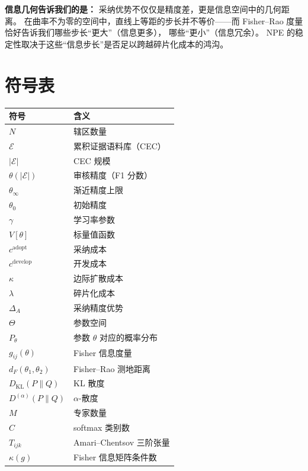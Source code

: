 \documentclass[12pt,a4paper]{article}
\theoremstyle{definition}
\theoremstyle{remark}
\newcommand{\Fisher}{g}
\newcommand{\KL}{D_{\text{KL}}}
\newcommand{\dalpha}{D^{(\alpha)}}
\begin{document}
\textbf{信息几何告诉我们的是：} 采纳优势不仅仅是精度差，更是信息空间中的几何距离。
在曲率不为零的空间中，直线上等距的步长并不等价——而 Fisher--Rao 度量恰好告诉我们哪些步长“更大”（信息更多），
哪些“更小”（信息冗余）。
NPE 的稳定性取决于这些“信息步长”是否足以跨越碎片化成本的鸿沟。

\appendix
\section{符号表}

\begin{center}
\begin{tabular}{@{}ll@{}}
\toprule
\textbf{符号} & \textbf{含义} \\
\midrule
$N$ & 辖区数量 \\
$\mathcal{E}$ & 累积证据语料库（CEC） \\
$|\mathcal{E}|$ & CEC 规模 \\
$\theta(|\mathcal{E}|)$ & 审核精度（F1 分数） \\
$\theta_\infty$ & 渐近精度上限 \\
$\theta_0$ & 初始精度 \\
$\gamma$ & 学习率参数 \\
$V[\theta]$ & 标量值函数 \\
$c^{\text{adopt}}$ & 采纳成本 \\
$c^{\text{develop}}$ & 开发成本 \\
$\kappa$ & 边际扩散成本 \\
$\lambda$ & 碎片化成本 \\
$\Delta_A$ & 采纳精度优势 \\
$\Theta$ & 参数空间 \\
$P_\theta$ & 参数 $\theta$ 对应的概率分布 \\
$\Fisher_{ij}(\theta)$ & Fisher 信息度量 \\
$d_F(\theta_1, \theta_2)$ & Fisher--Rao 测地距离 \\
$\KL(P\|Q)$ & KL 散度 \\
$\dalpha(P\|Q)$ & $\alpha$-散度 \\
$M$ & 专家数量 \\
$C$ & softmax 类别数 \\
$T_{ijk}$ & Amari--Chentsov 三阶张量 \\
$\kappa(\Fisher)$ & Fisher 信息矩阵条件数 \\
\bottomrule
\end{tabular}
\end{center}
\end{document}
